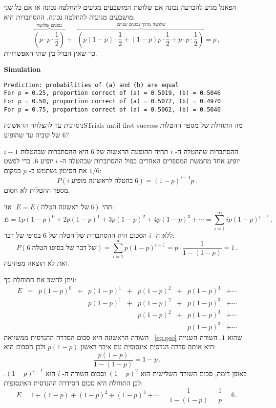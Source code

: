 \solution{}

הפאנל מגיע להכרעה נכונה אם שלושת המושבעים מגיעים להחלטה נכונה או אם כל שני מושבעים מגיעיה להחלטה נכונה. ההסתברות היא:
\[
\overbrace{\left(p\cdot p\cdot\frac{1}{2}\right)}^{\textrm{נכונים שלושה}}+\;\;\overbrace{\left(p(1-p)\cdot\frac{1}{2}+(1-p)p\cdot\frac{1}{2}+p\cdot p\cdot\frac{1}{2}\right)}^{\textrm{ שלושה מתוך נכונים שניים}}=p\,,
\]
כך שאין הבדל בין שתי האפשרויות.

\textbf{Simulation}
\begin{verbatim}
Prediction: probabilities of (a) and (b) are equal
For p = 0.25, proportion correct of (a) = 0.5019, (b) = 0.5046
For p = 0.50, proportion correct of (a) = 0.5072, (b) = 0.4970
For p = 0.75, proportion correct of (a) = 0.5062, (b) = 0.5040
\end{verbatim}


\begin{prob}{ניסיונות עד להצלחה הראשונה}{S}{Trials until first success}
\label{p.four}
מה התוחלת של מספר ההטלות של קוביה עד שהופיע $6$?
\end{prob}


ההסתברות שההטלה ה-%
$i$
תהיה ההופעה הראשוה של 
$6$
היא ההסתברות שבהטלות
$i-1$
יופיע אחד מחמשת המספרים האחרים כפול ההסתברות שבהטלה ה-%
$i$
יופיע 
$6$.
כדי לפשט את הסימון נשתמש ב-%
$p$
במקום
$1/6$:
\[
P(i\;\textrm{בהטלה לראשונה מופיע}\;6)=(1-p)^{i-1}p\,.
\]
מספר ההטלות לא חסום.

תהי
$E=E(\textrm{של ראשונה הטלה}\:6)$.
אזי:
\begin{equation}\label{eq.expectation}
E=1p(1-p)^0 + 2p(1-p)^1+ 3p(1-p)^2+ 4p(1-p)^3 +\cdots =\sum_{i=1}^{\infty} ip(1-p)^{i-1}\,.
\end{equation}
ללא ה-
$i$
הסכום היה ההסתברות של הטלה של $6$ בסופי של דבר:
\begin{equation}\label{eq.geo}
P(6\;\textrm{של דבר של בסופו הטלה})= \sum_{i=1}^{\infty} p(1-p)^{i-1}=p\cdot\frac{1}{1-(1-p)}=1\,.
\end{equation}
זאת לא תוצאה מפתיעה.

ניתן לחשב את התוחלת כך:
\[
\begin{array}{llllllllll}
E&=&p(1-p)^0 &+& p(1-p)^1&+& p(1-p)^2&+& p(1-p)^3 &+\cdots \\
& & &&p(1-p)^1&+& p(1-p)^2&+& p(1-p)^3 &+\cdots \\
&  &&&& &p(1-p)^2&+& p(1-p)^3 &+\cdots \\
&&&&&&&&p(1-p)^3 &+\cdots
\end{array}
\]
השורה הראשונה היא סכום הסדרה ההנדסית ממשוואה%
~\ref{eq.geo}
שהוא
$1$.
השורה השנייה היא אותה סדרה הנדסית אינסופית עם איבר ראשון 
$p(1-p)$
ולכן הסכום הוא:
\[
\frac{p(1-p)}{1-(1-p)}=1-p\,.
\]
באופן דומה, סכום השורה השלישית הוא
$(1-p)^2$ 
וסכום השורה ה-%
$i$
הוא
$(1-p)^{i-1}$.
לכן התוחלת היא סכום הסידרה ההנדסית האינסופית:
\[
E= 1 + (1-p) + (1-p)^2 + (1-p)^3 + \cdots= \frac{1}{1-(1-p)}=\frac{1}{p}=6\,.
\]


